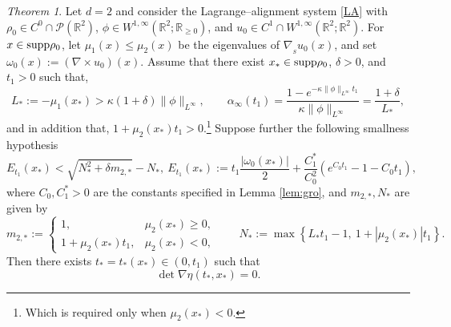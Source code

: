 \documentclass[11pt]{amsart}
\numberwithin{equation}{section}
\newtheorem{theorem}{Theorem}[section]
\theoremstyle{definition}
\theoremstyle{remark}
\numberwithin{equation}{section}
\newtheorem{theorem}{Theorem}[section]
\newcommand{\R}{\mathbb R}
\newcommand{\bq}{\begin{equation}}
\newcommand{\eq}{\end{equation}}
\newcommand{\lt}{\left}
\newcommand{\rt}{\right}
\newcommand{\calP}{\mathcal P}
\newcommand{\supp}{{\rm supp}}
\newcommand{\nabS}{\nabla_{\!\!{}_S}}
\renewcommand{\ge}{\geqslant}
\renewcommand{\le}{\leqslant}
\begin{document}
\begin{theorem}\label{thm:2d_gen_phi}
Let $d=2$ and consider the Lagrange--alignment system \eqref{LA} with $\rho_0\in C^0\cap\calP(\R^2)$, $\phi\in W^{1,\infty}(\R^2;\R_{\ge0})$, and $u_0\in C^1\cap W^{1,\infty}(\R^2;\R^2)$. For $x\in\supp\rho_0$, let $\mu_1(x)\le\mu_2(x)$ be the eigenvalues of $\nabS u_0(x)$, and set $\omega_0(x):=(\nabla\times u_0)(x)$. Assume that there exist $x_*\in\supp\rho_0$, $\delta>0$, and $t_1>0$ such that, 
\[
L_*:=-\mu_1(x_*) >\kappa(1+\delta)\|\phi\|_{L^\infty},
\qquad
\alpha_\infty(t_1) =\frac{1-e^{-\kappa\|\phi\|_{L^\infty}t_1}} {\kappa\|\phi\|_{L^\infty}} =\frac{1+\delta}{L_*},
\]
and in addition that, $1+\mu_2(x_*)t_1>0.$\footnote{Which is required only when $\mu_2(x_*)<0$.}\newline
Suppose further the following smallness hypothesis
\bq\label{eq:small_gen2d}
 E_{t_1}(x_*) < \sqrt{N_*^2+ \delta m_{2,*}} - N_*, \  E_{t_1}(x_*) := t_1\frac{|\omega_0(x_*)|}{2} +\frac{C_1^*}{C_0^2} \lt(e^{C_0t_1}-1-C_0t_1\rt),
\eq
where  $C_0, C_1^*>0$ are the constants specified  in Lemma \ref{lem:gro}, and $m_{2,*}, N_*$ are given by
\[
m_{2,*}:= \begin{cases}
1, & \mu_2(x_*)\ge0,\\
1+\mu_2(x_*)t_1, & \mu_2(x_*)<0,
\end{cases}
\qquad
N_*:=\max\lt\{L_*t_1-1,\ 1+|\mu_2(x_*)|t_1\rt\}.
\]
 Then there exists $t_*=t_*(x_*)\in(0,t_1)$ such that
\[
\det\nabla\eta(t_*,x_*)=0.
\]
\end{theorem}
\end{document}
